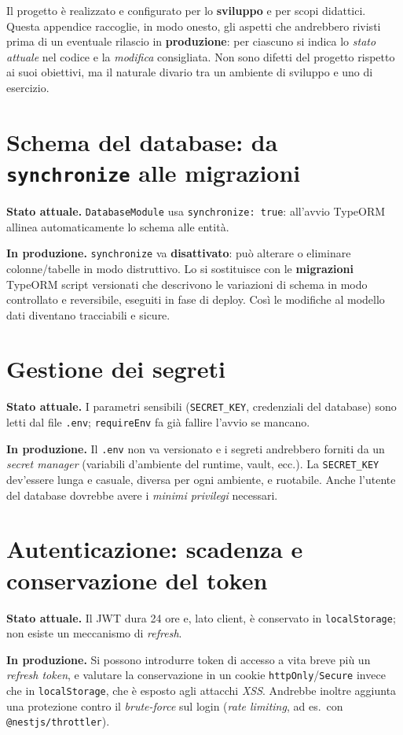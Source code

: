 \documentclass[11pt,a4paper,oneside]{report}
\newcommand{\code}[1]{\texttt{\small #1}}
\newcommand{\file}[1]{\texttt{\small #1}}
\begin{document}
Il progetto è realizzato e configurato per lo \textbf{sviluppo} e per scopi
didattici. Questa appendice raccoglie, in modo onesto, gli aspetti che andrebbero
rivisti prima di un eventuale rilascio in \textbf{produzione}: per ciascuno si
indica lo \emph{stato attuale} nel codice e la \emph{modifica} consigliata. Non
sono difetti del progetto rispetto ai suoi obiettivi, ma il naturale divario tra
un ambiente di sviluppo e uno di esercizio.

\section{Schema del database: da \texttt{synchronize} alle migrazioni}
\textbf{Stato attuale.} \code{DatabaseModule} usa \code{synchronize: true}:
all'avvio TypeORM allinea automaticamente lo schema alle entità.

\textbf{In produzione.} \code{synchronize} va \textbf{disattivato}: può alterare o
eliminare colonne/tabelle in modo distruttivo. Lo si sostituisce con le
\textbf{migrazioni} TypeORM \textemdash{} script versionati che descrivono le
variazioni di schema in modo controllato e reversibile, eseguiti in fase di
deploy. Così le modifiche al modello dati diventano tracciabili e sicure.

\section{Gestione dei segreti}
\textbf{Stato attuale.} I parametri sensibili (\code{SECRET\_KEY}, credenziali
del database) sono letti dal file \file{.env}; \code{requireEnv} fa già fallire
l'avvio se mancano.

\textbf{In produzione.} Il \file{.env} non va versionato e i segreti andrebbero
forniti da un \emph{secret manager} (variabili d'ambiente del runtime, vault,
ecc.). La \code{SECRET\_KEY} dev'essere lunga e casuale, diversa per ogni
ambiente, e ruotabile. Anche l'utente del database dovrebbe avere i \emph{minimi
privilegi} necessari.

\section{Autenticazione: scadenza e conservazione del token}
\textbf{Stato attuale.} Il JWT dura 24 ore e, lato client, è conservato in
\code{localStorage}; non esiste un meccanismo di \emph{refresh}.

\textbf{In produzione.} Si possono introdurre token di accesso a vita breve più un
\emph{refresh token}, e valutare la conservazione in un cookie
\code{httpOnly}/\code{Secure} invece che in \code{localStorage}, che è esposto
agli attacchi \emph{XSS}. Andrebbe inoltre aggiunta una protezione contro il
\emph{brute-force} sul login (\emph{rate limiting}, ad es.\ con
\code{@nestjs/throttler}).
\end{document}
